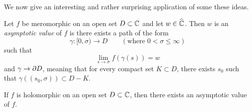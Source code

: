 \documentclass[a4paper,11pt]{article}
\begin{document}
We now give an interesting and rather surprising application of some
these ideas.

\begin{defn}
  \label{def:9}
  Let $f$ be meromorphic on an open set $D \subset {\mathbb C}$ and let $w
  \in \widehat{{\mathbb C}}$.  Then $w$ is an \emph{asymptotic value} of $f$
  is there exists a path of the form
  $$
  \gamma : [0, \sigma) \to D\qquad (\text{where }0 < \sigma \le \infty)
  $$
  such that
  $$
  \lim_{s \to \sigma} f(\gamma(s)) = w
  $$
  and $\gamma \to \partial D$, meaning that for every compact set $K \subset
  D$, there exists $s_0$ such that $\gamma((s_0, \sigma)) \subset D - K$.
\end{defn}

\begin{thm}
  \label{thm:1}
  If $f$ is holomorphic on an open set $D \subset {\mathbb C}$, then there
  exists an asymptotic value of $f$.
\end{thm}
\end{document}
